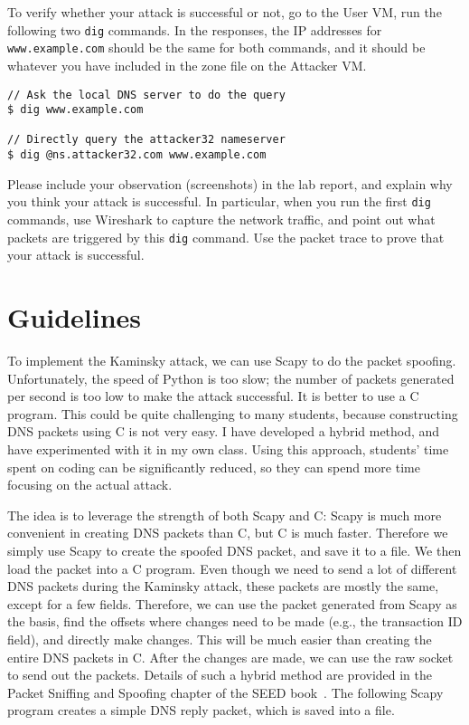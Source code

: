 To verify whether your attack is successful or not, 
go to the User VM, run the following two
\texttt{dig} commands. In the responses, the IP addresses for 
\texttt{www.example.com} should be the same for both 
commands, and it should be whatever you have included
in the zone file on the Attacker VM. 

\begin{lstlisting}
// Ask the local DNS server to do the query
$ dig www.example.com

// Directly query the attacker32 nameserver
$ dig @ns.attacker32.com www.example.com
\end{lstlisting}
 
Please include your observation (screenshots) in the lab 
report, and explain why you think your attack is successful. 
In particular, when you run the first \texttt{dig} commands,
use Wireshark to capture the network traffic, and 
point out what packets are triggered by this
\texttt{dig} command. Use the packet trace to 
prove that your attack is successful. 




\section{Guidelines} 

To implement the Kaminsky attack, we can use Scapy to do the packet spoofing. Unfortunately,
the speed of Python is too slow; the number of packets generated per second is too low to
make the attack successful. It is better to use a C program. This could
be quite challenging to many students, because constructing DNS packets using C is not very
easy. I have developed a hybrid method, and have experimented with it in my own class. Using
this approach, students' time spent on coding can be significantly reduced, so they can spend
more time focusing on the actual attack.


The idea is to leverage the strength of both Scapy and C: Scapy is much more convenient in
creating DNS packets than C, but C is much faster. Therefore we simply
use Scapy to create the spoofed DNS packet, and save it to a file.
We then load the packet into a C program. Even though we need to send a 
lot of different DNS packets
during the Kaminsky attack, these packets are mostly the same, except for a few fields. 
Therefore, we can
use the packet generated from Scapy as the basis, find the offsets where
changes need to be made (e.g., the transaction ID field),
and directly make changes. This will be much easier than
creating the entire DNS packets in C.
After the changes are made, we can use the raw socket to send out the packets.
Details of such a hybrid method are provided in
the Packet Sniffing and Spoofing chapter 
of the SEED book~\cite{seedbook}.
The following Scapy program creates a simple DNS reply packet, 
which is saved into a file.


